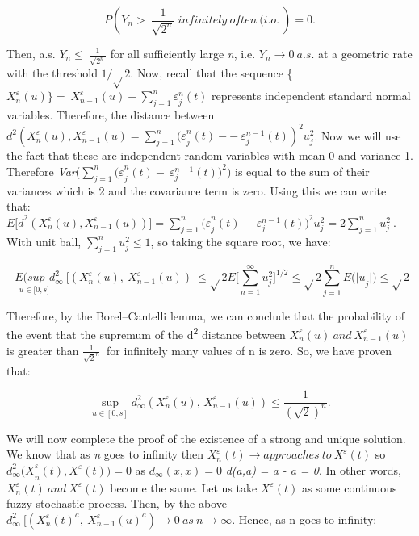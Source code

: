 \documentclass[12pt,a4paper]{report}
\numberwithin{equation}{section}
\begin{document}
\[P\left( Y_{n} > \ \frac{1}{\sqrt{2^{n}}}\ infinitely\ often\ (i.o.\  \right) = 0.\]

Then, a.s. \(Y_{n} \leq \ \frac{1}{\sqrt{2^{n}}}\) for all sufficiently
large \emph{n}, i.e. \(Y_{n} \rightarrow 0\ a.s.\) at a geometric rate
with the threshold \(1/\sqrt{}2.\) Now, recall that the sequence
\{\(X_{n}^{\varepsilon}(u)\} = \ X_{n - 1}^{\varepsilon}(u) + \sum_{j = 1}^{n}{\varepsilon_{j}^{n}(t)}\)
represents independent standard normal variables. Therefore, the
distance between
\(d^{2}(X_{n}^{\varepsilon}(u),X_{n - 1}^{\varepsilon}(u) = \sum_{j = 1}^{n}{{(\varepsilon}_{j}^{n}(t) --}\ \varepsilon_{j}^{n - 1}(t))^{2}u_{j}^{2}\).
Now we will use the fact that these are independent random variables
with mean 0 and variance 1. Therefore
\emph{Var}(\(\sum_{j = 1}^{n}{{(\varepsilon}_{j}^{n}(t) -}\ \varepsilon_{j}^{n - 1}(t))^{2})\)
is equal to the sum of their variances which is 2 and the covariance
term is zero. Using this we can write that:
\({E\lbrack d}^{2}(X_{n}^{\varepsilon}(u),X_{n - 1}^{\varepsilon}(u))\rbrack = \sum_{j = 1}^{n}{{(\varepsilon}_{j}^{n}(t) -}\ \varepsilon_{j}^{n - 1}(t))^{2}u_{j}^{2} = 2\sum_{j = 1}^{n}u_{j}^{2}\ .\ \)With
unit ball, \(\sum_{j = 1}^{n}u_{j}^{2} \leq 1\), so taking the square
root, we have:

\[\underset{\ \ \ \ \ u \in \lbrack 0,s\rbrack}{E(sup}{d_{\infty}^{2}\ \lbrack\left( X_{n}^{\varepsilon}(u),\ X_{n - 1}^{\varepsilon}(u) \right)\  \leq \sqrt{}2E\lbrack\sum_{n = 1}^{\infty}{u_{j}^{2}\rbrack^{1/2} \leq \sqrt{}2\sum_{j = 1}^{n}{{E(|u}_{j}|)}}} \leq \sqrt{}2\]

Therefore, by the Borel--Cantelli lemma, we can conclude that the
probability of the event that the supremum of the d\textsuperscript{2}
distance between
\(X_{n}^{\varepsilon}(u)\ and\ X_{n - 1}^{\varepsilon}(u)\) is greater
than \(\frac{1}{{\sqrt{2}}^{n}}\ \) for infinitely many values of n is
zero. So, we have proven that:

\begin{equation}\tag{5.1.20}\label{eq:5.1.20}
\sup_{u\in[0,s]}
d_{\infty}^{2}\!\left(X_{n}^{\varepsilon}(u),\,X_{n-1}^{\varepsilon}(u)\right)
\le \frac{1}{(\sqrt{2})^{n}} .
\end{equation}


We will now complete the proof of the existence of a strong and unique
solution. We know that as \emph{n} goes to infinity then
\(X_{n}^{\varepsilon}(t) \rightarrow approaches\ to\ X^{\varepsilon}(t)\)
so \(d_{\infty}^{2}{(X}_{n}^{\varepsilon}(t){,X}^{\varepsilon}(t)) = 0\)
as \(d_{\infty}(x,x) = 0\) \emph{d(a,a) = a - a = 0}. In other words,
\(X_{n}^{\varepsilon}(t)\ and\ X^{\varepsilon}(t)\) become the same. Let
us take \(X^{\varepsilon}(t)\) as some continuous fuzzy stochastic
process. Then, by the above
\(d_{\infty}^{2}\ \lbrack\left( {X_{n}^{\varepsilon}(t)}^{a},\ {X_{n - 1}^{\varepsilon}(u)}^{a} \right) \rightarrow 0\ as\ n \rightarrow \infty\).
Hence, as n goes to infinity:
\end{document}
